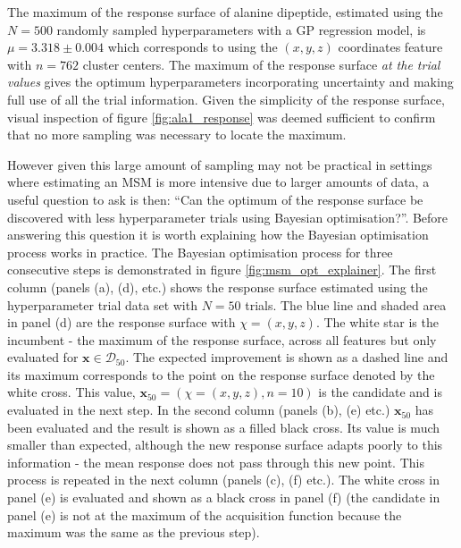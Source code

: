 The maximum of the response surface of alanine dipeptide, estimated using the $N=500$ randomly sampled hyperparameters with a GP regression model, is $\mu=\num{3.318}\pm\num{0.004}$ which corresponds to using the $(x, y, z)$ coordinates feature with $n=762$ cluster centers.  The maximum of the response surface \emph{at the trial values} gives the optimum hyperparameters incorporating uncertainty and making full use of all the trial information.  Given the simplicity of the response surface, visual inspection of figure \ref{fig:ala1_response} was deemed sufficient to confirm that no more sampling was necessary to locate the maximum. 

However given this large amount of sampling may not be practical in settings where estimating an MSM is more intensive due to larger amounts of data, a useful question to ask is then: ``Can the optimum of the response surface be discovered with less hyperparameter trials using Bayesian optimisation?''.  Before answering this question it is worth explaining how the Bayesian optimisation process works in practice. The Bayesian optimisation process for three consecutive steps is demonstrated in figure \ref{fig:msm_opt_explainer}. The first column (panels (a), (d), etc.) shows the response surface estimated using the hyperparameter trial data set with $N=50$ trials. The blue line and shaded area in panel (d) are the response surface with $\chi=(x, y, z)$. The white star is the incumbent - the maximum of the response surface, across all features but only evaluated for $\mathbf{x}\in \mathcal{D}_{50}$. The expected improvement is shown as a dashed line and its maximum corresponds to the point on the response surface denoted by the white cross. This value,  $\mathbf{x}_{50} = \left(\chi=(x, y, z), n=10\right)$ is the candidate and is evaluated in the  next step. In the second column (panels (b), (e) etc.) $\mathbf{x}_{50}$ has been evaluated and the result is shown as a filled black cross. Its value is much smaller than expected, although the new response surface adapts poorly to this information - the mean response does not pass through this new point. This process is repeated in the next column (panels (c), (f) etc.). The white cross in panel (e) is evaluated and shown as a black cross in panel (f) (the candidate in panel (e) is not at the maximum of the acquisition function because the maximum  was the same as the previous step).

